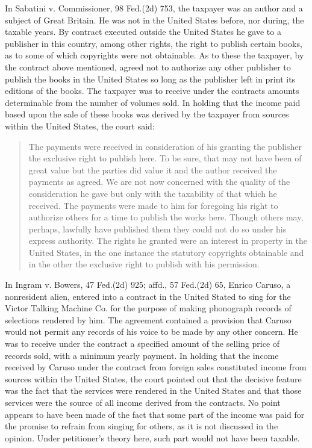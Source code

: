 \begin{select}
In Sabatini v. Commissioner, 98 Fed.(2d) 753, the taxpayer was an author and a subject of Great Britain. He was not in the United States before, nor during, the taxable years. By contract executed outside the United States he gave to a publisher in this country, among other rights, the right to publish certain books, as to some of which copyrights were not obtainable. As to these the taxpayer, by the contract above mentioned, agreed not to authorize any other publisher to publish the books in the United States so long as the publisher left in print its editions of the books. The taxpayer was to receive under the contracts amounts determinable from the number of volumes sold. In holding that the income paid based upon the sale of these books was derived by the taxpayer from sources within the United States, the court said:
\begin{quote}The payments were received in consideration of his granting the publisher the exclusive right to publish here. To be sure, that may not have been of great value but the parties did value it and the author received the payments as agreed. We are not now concerned with the quality of the consideration he gave but only with the taxability of that which he received. The payments were made to him for foregoing his right to authorize others for a time to publish the works here. Though others may, perhaps, lawfully have published them they could not do so under his express authority. The rights he granted were an interest in property in the United States, in the one instance the statutory copyrights obtainable and in the other the exclusive right to publish with his permission.
\end{quote}

In Ingram v. Bowers, 47 Fed.(2d) 925; affd., 57 Fed.(2d) 65, Enrico Caruso, a nonresident alien, entered into a contract in the United Stated to sing for the Victor Talking Machine Co. for the purpose of making phonograph records of selections rendered by him. The agreement contained a provision that Caruso would not permit any records of his voice to be made by any other concern. He was to receive under the contract a specified amount of the selling price of records sold, with a minimum yearly payment. In holding that the income received by Caruso under the contract from foreign sales constituted income from sources within the United States, the court pointed out that the decisive feature was the fact that the services were rendered in the United States and that those services were the source of all income derived from the contracts. No point appears to have been made of the fact that some part of the income was paid for the promise to refrain from singing for others, as it is not discussed in the opinion. Under petitioner's theory here, such part would not have been taxable.


\end{select}
